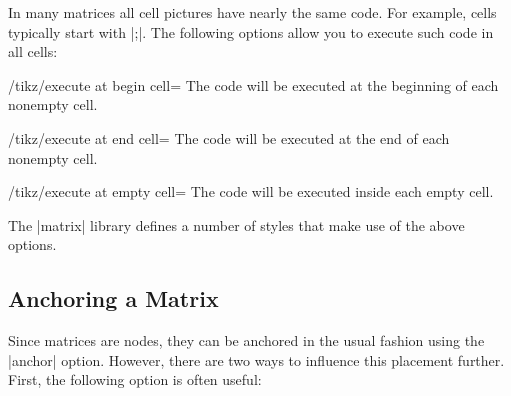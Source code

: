 In many matrices all cell pictures have nearly the same code. For
example, cells typically start with |;|. The
following options allow you to execute such code in all cells:

\begin{key}{/tikz/execute at begin cell=}
  The code will be executed at the beginning of each nonempty cell.
\end{key}
\begin{key}{/tikz/execute at end cell=}
  The code will be executed at the end of each nonempty cell.
\end{key}
\begin{key}{/tikz/execute at empty cell=}
  The code will be executed inside each empty cell.
\end{key}

\begin{codeexample}[]
\end{codeexample}
\begin{codeexample}[]
\end{codeexample}

The |matrix| library defines a number of styles that make use of the
above options.




\subsection{Anchoring a Matrix}

Since matrices are nodes, they can be anchored in the usual fashion
using the |anchor| option. However, there are two ways to influence
this placement further. First, the following option is often useful:

